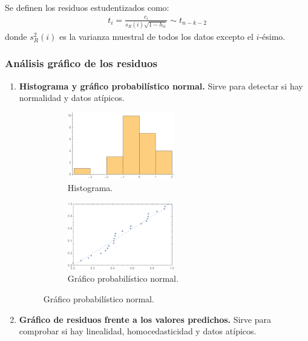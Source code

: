 \noindent Se definen los residuos estudentizados como:
\begin{align*}
    \boxed{
    t_i = \frac{e_i}{s_R(i)\sqrt{1-h_{ii}}} \sim t_{n-k-2}
    }
\end{align*}
donde $s_R^2(i)$ es la varianza muestral de todos los datos excepto el $i$-ésimo.

\subsubsection{Análisis gráfico de los residuos}
\begin{enumerate}
    \item \textbf{Histograma y gráfico probabilístico normal.}
          Sirve para detectar si hay normalidad y datos atípicos.
          \begin{figure}[H]
  \begin{subfigure}[b]{0.55\textwidth}
    \centering
        \includegraphics[width=0.55\textwidth]{imagenes2/histograma.png}
        \caption{Histograma.}
  \end{subfigure}
  \hfill
    \begin{subfigure}[b]{0.55\textwidth}
        \centering
        \includegraphics[width=0.55\textwidth]{imagenes2/probabilityplot.png}
        \caption{Gráfico probabilístico normal.}
  \end{subfigure}
\end{figure}
    \item \textbf{Gráfico de residuos frente a los valores predichos.}
          Sirve para comprobar si hay linealidad, homocedasticidad y datos atípicos.

\end{enumerate}
